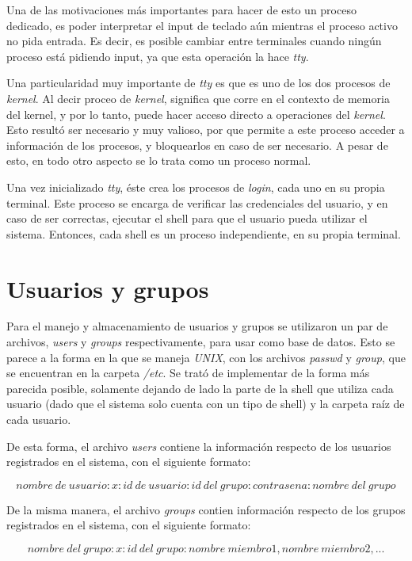 \documentclass[a4paper,10pt]{article}
\begin{document}
Una de las motivaciones más importantes para hacer de esto un proceso dedicado, es poder interpretar el input de teclado aún mientras el proceso activo no pida entrada.
Es decir, es posible cambiar entre terminales cuando ningún proceso está pidiendo input, ya que esta operación la hace \textit{tty}.

Una particularidad muy importante de \textit{tty} es que es uno de los dos procesos de \textit{kernel}.
Al decir proceo de \textit{kernel}, significa que corre en el contexto de memoria del kernel, y por lo tanto, puede hacer acceso directo a operaciones del \textit{kernel}.
Esto resultó ser necesario y muy valioso, por que permite a este proceso acceder a información de los procesos, y bloquearlos en caso de ser necesario.
A pesar de esto, en todo otro aspecto se lo trata como un proceso normal.

Una vez inicializado \textit{tty}, éste crea los procesos de \textit{login}, cada uno en su propia terminal.
Este proceso se encarga de verificar las credenciales del usuario, y en caso de ser correctas, ejecutar el shell para que el usuario pueda utilizar el sistema.
Entonces, cada shell es un proceso independiente, en su propia terminal.

\newpage
\section{Usuarios y grupos}
Para el manejo y almacenamiento de usuarios y grupos se utilizaron un par de archivos, \textit{users} y \textit{groups} respectivamente, para usar como 
base de datos. Esto se parece a la forma en la que se maneja \textit{UNIX}, con los archivos \textit{passwd} y \textit{group}, que se encuentran en la carpeta
\textit{/etc}. Se trató de implementar de la forma más parecida posible, solamente dejando de lado la parte de la shell que utiliza cada usuario (dado que el sistema
solo cuenta con un tipo de shell) y la carpeta raíz de cada usuario.

De esta forma, el archivo \textit{users} contiene la información respecto de los usuarios registrados en el sistema, con el siguiente formato:

\[nombre\ de\ usuario:x: id\ de\ usuario: id\ del\ grupo: contrasena: nombre\ del\ grupo\]

De la misma manera, el archivo \textit{groups} contien información respecto de los grupos registrados en el sistema, con el siguiente formato:

\[nombre\ del\ grupo:x: id\ del\ grupo:nombre\ miembro1, nombre\ miembro2, ...\]
\end{document}
